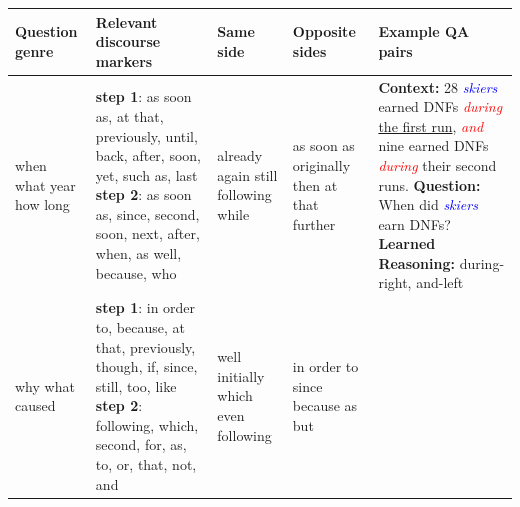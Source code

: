 \begin{table}[t]
\centering
{
	\fontsize{9}{9}\selectfont
  \setlength{\tabcolsep}{1.0mm}
  \renewcommand{\arraystretch}{1.1}
	\begin{tabular}{|p{2cm}|p{4cm}|p{1.5cm}|p{1.5cm}|p{6cm}|}
 	\hline
 	\textbf{Question genre} & \textbf{Relevant discourse markers}& \textbf{Same side}& \textbf{Opposite sides} & \textbf{Example QA pairs} \\
 	\hline
 	when \newline what year \newline how long 
 	& \textbf{step 1}: as soon as, at that, previously, until, back, after, soon, yet, such as, last \newline \textbf{step 2}: as soon as, since, second, soon, next, after, when, as well, because, who 
	& already \newline again \newline still \newline following \newline while & as soon as \newline originally \newline then \newline at that \newline further
 	& \textbf{Context: }28 \textit{\textcolor{blue}{skiers}} earned DNFs \textit{\textcolor{red}{during}} \underline{the first run}, \textit{\textcolor{red}{and}} nine earned DNFs \textit{\textcolor{red}{during}} their second runs.
  \newline \textbf{Question: }When did \textit{\textcolor{blue}{skiers}} earn DNFs? 
  \newline \textbf{Learned Reasoning: } during-right, and-left\\ 
	\hline
  why \newline what caused 
  &\textbf{step 1}: in order to, because, at that, previously, though, if, since, still, too, like \newline \textbf{step 2}: following, which, second, for, as, to, or, that, not, and & well \newline initially \newline which \newline even \newline following & in order to \newline since \newline because \newline as \newline but

\end{tabular}}
\end{table}
